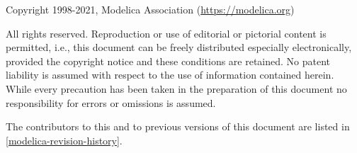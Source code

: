 Copyright \textcopyright{} 1998-2021, Modelica Association (\url{https://modelica.org})

All rights reserved.
Reproduction or use of editorial or pictorial content is permitted, i.e., this document can be freely distributed especially electronically, provided the copyright notice and these conditions are retained.
No patent liability is assumed with respect to the use of information contained herein.
While every precaution has been taken in the preparation of this document no responsibility for errors or omissions is assumed.

The contributors to this and to previous versions of this document are listed in \cref{modelica-revision-history}.

